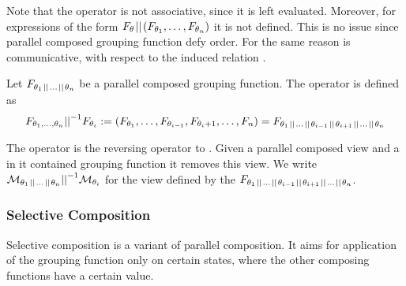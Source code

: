 \documentclass[preview]{standalone}
\begin{document}
%
%

Note that the operator \pll is not associative, since it is left evaluated. Moreover, for expressions of the form $\grpfct[\viewppty] \pll (\grpfct[\viewppty_1], \dots, \grpfct[\viewppty_n])$ it is not defined. This is no issue since parallel composed grouping function defy order. For the same reason \pll is communicative, with respect to the induced relation \eqrelview.

\begin{definition}
	Let $\grpfct[\viewppty_1 \pll \dots \pll \viewppty_n]$ be a parallel composed grouping function. The operator \pllrev is defined as
	\[
	\grpfct[\viewppty_1, \dots, \viewppty_n] \pllrev \grpfct[\viewppty_i] := (\grpfct[\viewppty_1], \dots, \grpfct[\viewppty_{i-1}],\grpfct[\viewppty_i+1], \dots, \grpfct[n]) = \grpfct[\viewppty_1 \pll \dots \pll \viewppty_{i-1} \pll \viewppty_{i+1} \pll \dots \pll \viewppty_n]
	\]
\end{definition}

The operator \pllrev is the reversing operator to \pll. Given a parallel composed view and a in it contained grouping function it removes this view. We write $\view[\viewppty_1 \pll \dots \pll \viewppty_n] \pllrev \view[\viewppty_i]$ for the view defined by the \grpfctN $\grpfct[\viewppty_1 \pll \dots \pll \viewppty_{i-1} \pll \viewppty_{i+1} \pll \dots \pll \viewppty_n]$.

\subsubsection{Selective Composition} \label{subsec:selecitvecomp}
Selective composition is a variant of parallel composition. It aims for application of the grouping function only on certain states, where the other composing functions have a certain value.
\end{document}
